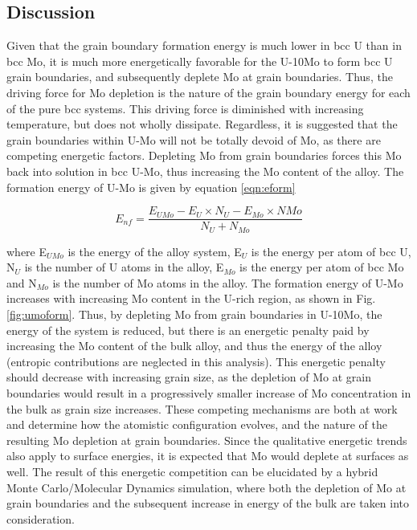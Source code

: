 \documentclass[review]{elsarticle}
\begin{document}
\FloatBarrier

\subsection{Discussion}

Given that the grain boundary formation energy is much lower in bcc U than in bcc Mo, it is much more energetically favorable for the U-10Mo to form bcc U grain boundaries, and subsequently deplete Mo at grain boundaries. Thus, the driving force for Mo depletion is the nature of the grain boundary energy for each of the pure bcc systems. This driving force is diminished with increasing temperature, but does not wholly dissipate. Regardless, it is suggested that the grain boundaries within U-Mo will not be totally devoid of Mo, as there are competing energetic factors. Depleting Mo from grain boundaries forces this Mo back into solution in bcc U-Mo, thus increasing the Mo content of the alloy. The formation energy of U-Mo is given by equation \ref{eqn:eform}

\begin{equation}
\label{eqn:eform}
E_{nf}= \frac{ E_{UMo} - E_{U} \times N_{U} - E_{Mo} \times N{Mo} }{ N_{U} + N_{Mo} }
\end{equation}

where E$_{UMo}$ is the energy of the alloy system, E$_{U}$ is the energy per atom of bcc U, N$_{U}$ is the number of U atoms in the alloy, E$_{Mo}$ is the energy per atom of bcc Mo and N$_{Mo}$ is the number of Mo atoms in the alloy. The formation energy of U-Mo increases with increasing Mo content in the U-rich region, as shown in Fig. \ref{fig:umoform}. Thus, by depleting Mo from grain boundaries in U-10Mo, the energy of the system is reduced, but there is an energetic penalty paid by increasing the Mo content of the bulk alloy, and thus the energy of the alloy (entropic contributions are neglected in this analysis). This energetic penalty should decrease with increasing grain size, as the depletion of Mo at grain boundaries would result in a progressively smaller increase of Mo concentration in the bulk as grain size increases. These competing mechanisms are both at work and determine how the atomistic configuration evolves, and the nature of the resulting Mo depletion at grain boundaries. Since the qualitative energetic trends also apply to surface energies, it is expected that Mo would deplete at surfaces as well. The result of this energetic competition can be elucidated by a hybrid Monte Carlo/Molecular Dynamics simulation, where both the depletion of Mo at grain boundaries and the subsequent increase in energy of the bulk are taken into consideration.
\end{document}
